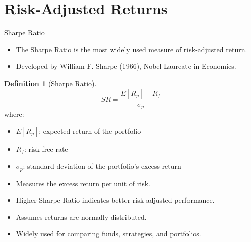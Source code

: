 \documentclass[9pt, aspectratio=169, t]{beamer}
\theoremstyle{definition}
\newtheorem{defn}{Definition}
\begin{document}
\section{Risk-Adjusted Returns}

\begin{frame}{Sharpe Ratio}

\begin{itemize}
    \item The Sharpe Ratio is the most widely used measure of risk-adjusted return.
    \item Developed by William F. Sharpe (1966), Nobel Laureate in Economics.
\end{itemize}

\vspace{0.3cm}

\begin{defn}[Sharpe Ratio]
\[
SR = \frac{E[R_p] - R_f}{\sigma_p}
\]
where:
\begin{itemize}
    \item $E[R_p]$: expected return of the portfolio
    \item $R_f$: risk-free rate
    \item $\sigma_p$: standard deviation of the portfolio's excess return
\end{itemize}
\end{defn}

\vspace{0.3cm}

\begin{itemize}
    \item Measures the excess return per unit of risk.
    \item Higher Sharpe Ratio indicates better risk-adjusted performance.
    \item Assumes returns are normally distributed.
    \item Widely used for comparing funds, strategies, and portfolios.
\end{itemize}

\end{frame}
\end{document}
